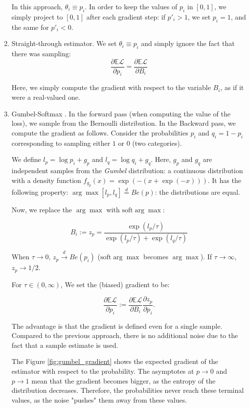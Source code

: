 \documentclass[a4paper,11pt,oneside]{report}
\begin{document}
\begin{enumerate}
    In this approach, $\theta_i\equiv p_i$. In order to keep the values of $p_i$ in $[0,1]$, we simply project to $[0,1]$ after each gradient step: if $p'_i>1$, we set $p_i=1$, and the same for $p'_i<0$.

    \item Straight-through estimator. We set $\theta_i\equiv p_i$ and simply ignore the fact that there was sampling:
    $$
    \frac{\partial \mathbb E \mathcal L}{\partial p_i}=\frac{\partial \mathbb E \mathcal L}{\partial B_i}
    $$

    Here, we simply compute the gradient with respect to the variable $B_i$, as if it were a real-valued one.
    \item Gumbel-Softmax \cite{Jang}. In the forward pass (when computing the value of the loss), we sample from the Bernoulli distribution. In the Backward pass, we compute the gradient as follows. Consider the probabilities $p_i$ and $q_i=1-p_i$ corresponding to sampling either $1$ or $0$ (two categories).

    We define $l_p=\log p_i+g_p$ and $l_q=\log q_i+g_q$. Here, $g_p$ and $g_q$ are independent samples from the {\em Gumbel} distribution: a continuous distribution with a density function $f_{g_p}(x)=\exp(-(x+\exp(-x)))$. It has the following property: $\arg\max [l_p, l_q]\overset{d}{=}Be(p)$: the distributions are equal.

    Now, we replace the $\arg\max$ with $\mbox{soft}\arg\max$:

    $$
    B_i:=z_p=\frac{\exp(l_p/\tau)}{\exp(l_p/\tau)+\exp(l_q/\tau)}
    $$

    When $\tau\to 0$, $z_p\overset{d}{\to} Be(p_i)$ ($\mbox{soft}\arg\max$ becomes $\arg\max$). If $\tau\to\infty$, $z_p\to1/2$.

    For $\tau\in(0,\infty)$, We set the (biased) gradient to be:

    $$
    \frac{\partial \mathbb E\mathcal L}{\partial p_i}:=\frac{\partial \mathbb E \mathcal L}{\partial B_i}\frac{\partial z_p}{\partial p_i}.
    $$

    The advantage is that the gradient is defined even for a single sample. Compared to the previous approach, there is no additional noise due to the fact that a sample estimate is used.

    The Figure \ref{fig:gumbel_gradient} shows the expected gradient of the estimator \cite{andriyash2018improved} with respect to the probability.
    The asymptotes at $p\to 0$ and $p\to 1$ mean that the gradient becomes bigger, as the entropy of the distribution decreases. Therefore, the probabilities never reach these terminal values, as the noise "pushes" them away from these values.


\end{enumerate}
\end{document}
